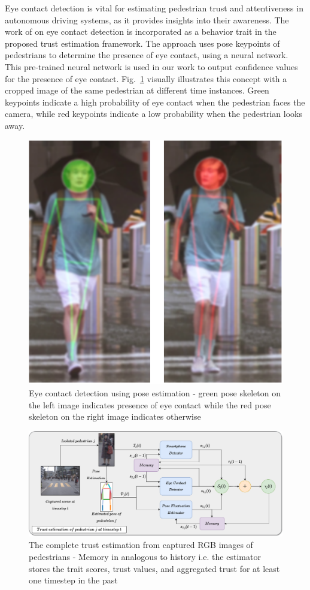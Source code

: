 \documentclass[journal]{IEEEtran}
\begin{document}
Eye contact detection is vital for estimating pedestrian trust and attentiveness in autonomous driving systems, as it provides insights into their awareness. The work of \cite{belkada2021pedestrians} on eye contact detection is incorporated as a behavior trait in the proposed trust estimation framework. The approach uses pose keypoints of pedestrians to determine the presence of eye contact, using a neural network. This pre-trained neural network is used in our work to output confidence values for the presence of eye contact. Fig.~\ref{eye_contact} visually illustrates this concept with a cropped image of the same pedestrian at different time instances. Green keypoints indicate a high probability of eye contact when the pedestrian faces the camera, while red keypoints indicate a low probability when the pedestrian looks away. 
\begin{figure}
  \centering
  \includegraphics[width=0.5\columnwidth]{eye_contact}
  \caption{Eye contact detection using pose estimation \cite{belkada2021pedestrians} - green pose skeleton on the left image indicates presence of eye contact while the red pose skeleton on the right image indicates otherwise}
  \label{eye_contact}
\end{figure}

\begin{figure}
  \centering
  \includegraphics[width=1.95\columnwidth]{combined}
  \caption{The complete trust estimation from captured RGB images of pedestrians - Memory in analogous to history i.e. the estimator stores the trait scores, trust values, and aggregated trust for at least one timestep in the past}
  \label{combined}
\end{figure}
\end{document}
